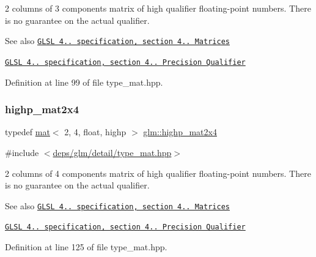 2 columns of 3 components matrix of high qualifier floating-\/point numbers. There is no guarantee on the actual qualifier.

\begin{DoxySeeAlso}{See also}
\href{http://www.opengl.org/registry/doc/GLSLangSpec.4.20.8.pdf}{\tt G\+L\+SL 4.. specification, section 4.. Matrices} 

\href{http://www.opengl.org/registry/doc/GLSLangSpec.4.20.8.pdf}{\tt G\+L\+SL 4.. specification, section 4.. Precision Qualifier} 
\end{DoxySeeAlso}


Definition at line 99 of file type\+\_\+mat.\+hpp.

\mbox{\label{group__core__precision_ga4ad5980b248b3d4dcf014db8fa4495cf}} 
\subsubsection{\texorpdfstring{highp\+\_\+mat2x4}{highp\_mat2x4}}
{\footnotesize\ttfamily typedef \hyperlink{structglm_1_1mat}{mat}$<$ 2, 4, float, highp $>$ \hyperlink{group__core__precision_ga4ad5980b248b3d4dcf014db8fa4495cf}{glm\+::highp\+\_\+mat2x4}}



{\ttfamily \#include $<$\hyperlink{type__mat_8hpp}{deps/glm/detail/type\+\_\+mat.\+hpp}$>$}

2 columns of 4 components matrix of high qualifier floating-\/point numbers. There is no guarantee on the actual qualifier.

\begin{DoxySeeAlso}{See also}
\href{http://www.opengl.org/registry/doc/GLSLangSpec.4.20.8.pdf}{\tt G\+L\+SL 4.. specification, section 4.. Matrices} 

\href{http://www.opengl.org/registry/doc/GLSLangSpec.4.20.8.pdf}{\tt G\+L\+SL 4.. specification, section 4.. Precision Qualifier} 
\end{DoxySeeAlso}


Definition at line 125 of file type\+\_\+mat.\+hpp.

\mbox{\label{group__core__precision_gaa1178bd043ab93d1207bda8d06cd078c}} 
